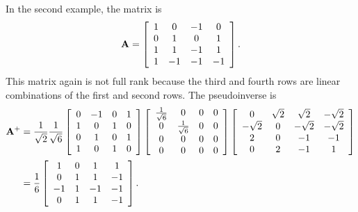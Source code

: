 In the second example, the matrix is
\begin{align}
  \mathbf{A} = \left[ \begin{array}{c c c c}
   1 &  0 & -1 &  0 \\
   0 &  1 &  0 &  1 \\
   1 &  1 & -1 &  1 \\
   1 & -1 & -1 & -1 \\ \end{array} \right] .
\end{align}
This matrix again is not full rank because the third and fourth rows are linear combinations of the first and second rows. The pseudoinverse is
\begin{align}
  \mathbf{A}^+ &= \frac{1}{\sqrt{2}} \frac{1}{\sqrt{6}}  \left[ \begin{array}{c c c c}
   0 & -1 &  0 &  1 \\
   1 &  0 &  1 &  0 \\
   0 &  1 &  0 &  1 \\
   1 &  0 &  1 &  0 \\ \end{array} \right] 
  \left[ \begin{array}{c c c c}
   \frac{1}{\sqrt{6}} &  0 &  0 &  0 \\
   0 &  \frac{1}{\sqrt{6}} &  0 &  0 \\
   0 &  0 &  0 &  0 \\
   0 &  0 &  0 &  0 \\ \end{array} \right]  
  \left[ \begin{array}{c c c c}
   0 		&  \sqrt{2} &  \sqrt{2} & -\sqrt{2} \\
  -\sqrt{2} &  0	 	& -\sqrt{2} & -\sqrt{2} \\
   2 		&  0 		& -1 		& -1 \\
   0 		&  2 		& -1 		&  1 \\ \end{array} \right] \nonumber \\
   &=
  \frac{1}{6} \left[ \begin{array}{c c c c}
   1 &  0 &  1 &  1 \\
   0 &  1 &  1 & -1 \\
  -1 &  1 & -1 & -1 \\
   0 &  1 &  1 & -1 \\ \end{array} \right] .
\end{align}

